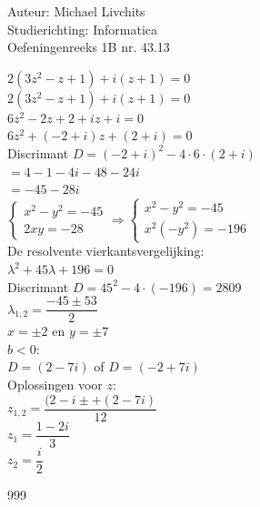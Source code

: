 \documentclass[a4paper]{article}
\begin{document}
  
\noindent \large Auteur: Michael Livchits \\
\noindent \large Studierichting: Informatica\\
\noindent \large Oefeningenreeks 1B nr. 43.13\\

\medskip

\normalsize

$2(3z^2 - z +1) + i(z +1) = 0 $\\

$ 2(3z^2 - z +1) + i(z +1) = 0 $\\

$ 6z^2 - 2z +2 +iz +i = 0 $\\

$ 6z^2 + (-2 +i)z + (2 + i) = 0 $\\

Discrimant $D = (-2 +i)^2 - 4\cdot6\cdot(2 + i) $\\

$ = 4 - 1 - 4i - 48 -24i $\\

$ = -45 - 28i $\\

$\left\{
\begin{array}{l}
	x^2-y^2 = -45 \\
	2xy = -28
\end{array}
\right .\Rightarrow
\left\{
\begin{array}{l} 
	x^2-y^2 = -45 \\
	x^2(-y^2) = -196
\end{array}
\right .$\\

De resolvente vierkantsvergelijking: \\

$\lambda^2 + 45\lambda + 196 = 0 $\\

Discrimant $D = 45^2 - 4 \cdot (-196) = 2809 $\\

$\lambda_{1,2} = \dfrac{-45\pm 53}{2} $ \\

$ x = \pm 2$ en $ y= \pm 7$ \\

$ b < 0 $:\\

$D = \left(2-7i\right) $ of $D = \left(-2+7i\right) $ \\

Oplossingen voor $z$: \\

$z_{1,2} = \dfrac{(2-i\pm+(2-7i)}{12}$\\

$z_{1} = \dfrac{1-2i}{3}$\\

$z_{2} = \dfrac{i}{2}$\\


\begin{thebibliography}{999}
\end{thebibliography}
\end{document}

